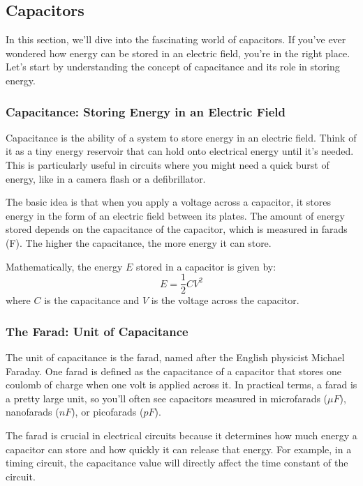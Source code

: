 \subsection{Capacitors}
\label{subsec:capacitors}

In this section, we'll dive into the fascinating world of capacitors. If you've ever wondered how energy can be stored in an electric field, you're in the right place. Let's start by understanding the concept of capacitance and its role in storing energy.

\subsubsection*{Capacitance: Storing Energy in an Electric Field}

Capacitance is the ability of a system to store energy in an electric field. Think of it as a tiny energy reservoir that can hold onto electrical energy until it's needed. This is particularly useful in circuits where you might need a quick burst of energy, like in a camera flash or a defibrillator.

The basic idea is that when you apply a voltage across a capacitor, it stores energy in the form of an electric field between its plates. The amount of energy stored depends on the capacitance of the capacitor, which is measured in farads (F). The higher the capacitance, the more energy it can store.

Mathematically, the energy \( E \) stored in a capacitor is given by:
\begin{equation}
    E = \frac{1}{2} C V^2
\end{equation}
where \( C \) is the capacitance and \( V \) is the voltage across the capacitor.

\subsubsection*{The Farad: Unit of Capacitance}

The unit of capacitance is the farad, named after the English physicist Michael Faraday. One farad is defined as the capacitance of a capacitor that stores one coulomb of charge when one volt is applied across it. In practical terms, a farad is a pretty large unit, so you'll often see capacitors measured in microfarads (\( \mu F \)), nanofarads (\( nF \)), or picofarads (\( pF \)).

The farad is crucial in electrical circuits because it determines how much energy a capacitor can store and how quickly it can release that energy. For example, in a timing circuit, the capacitance value will directly affect the time constant of the circuit.

